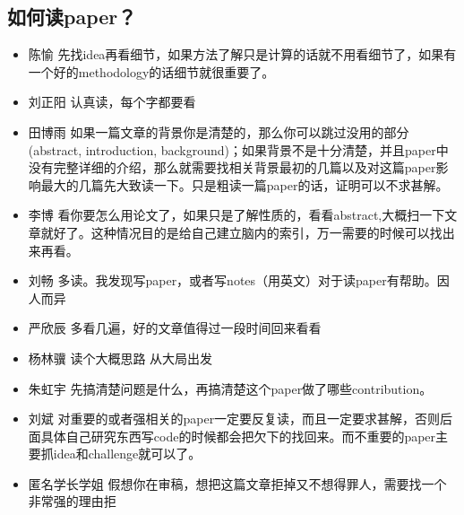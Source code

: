 \documentclass{vivid_layout}
\begin{document}
\subsection{如何读paper？}
\begin{itemize}
\item  { 陈愉}  \quad  先找idea再看细节，如果方法了解只是计算的话就不用看细节了，如果有一个好的methodology的话细节就很重要了。
\item  { 刘正阳}  \quad 认真读，每个字都要看
\item  { 田博雨}  \quad 如果一篇文章的背景你是清楚的，那么你可以跳过没用的部分(abstract, introduction, background)；如果背景不是十分清楚，并且paper中没有完整详细的介绍，那么就需要找相关背景最初的几篇以及对这篇paper影响最大的几篇先大致读一下。只是粗读一篇paper的话，证明可以不求甚解。
\item  { 李博}  \quad 看你要怎么用论文了，如果只是了解性质的，看看abstract,大概扫一下文章就好了。这种情况目的是给自己建立脑内的索引，万一需要的时候可以找出来再看。
\item  { 刘畅}  \quad 多读。我发现写paper，或者写notes（用英文）对于读paper有帮助。因人而异
\item  { 严欣辰}  \quad 多看几遍，好的文章值得过一段时间回来看看
\item  { 杨林骥}  \quad 读个大概思路 从大局出发
\item  { 朱虹宇}  \quad 先搞清楚问题是什么，再搞清楚这个paper做了哪些contribution。
\item  { 刘斌}  \quad 对重要的或者强相关的paper一定要反复读，而且一定要求甚解，否则后面具体自己研究东西写code的时候都会把欠下的找回来。而不重要的paper主要抓idea和challenge就可以了。
\item {\name 匿名学长学姐}  \quad 假想你在审稿，想把这篇文章拒掉又不想得罪人，需要找一个非常强的理由拒
\end{itemize}
\end{document}
